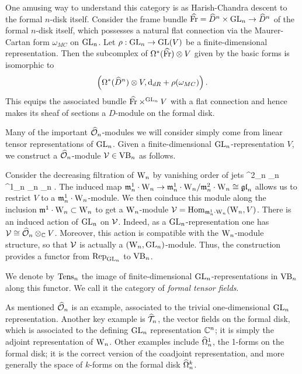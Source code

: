 \documentclass[10pt]{amsart}
\begin{document}
\begin{rmk}
One amusing way to understand this category is as Harish-Chandra descent to the formal $n$-disk itself. 
Consider the frame bundle $\widehat{{\rm Fr}} = \widehat{D}^n \times {\rm GL}_n \to \widehat{D}^n$ of the formal $n$-disk itself, 
which possesses a natural flat connection via the Maurer-Cartan form $\omega_{MC}$ on ${\rm GL}_n$. 
Let $\rho: {\rm GL}_n \to {\rm GL}(V)$ be a finite-dimensional representation. 
Then the subcomplex of $\Omega^*(\widehat{{\rm Fr}})\otimes V$ given by the basic forms is isomorphic to
\[
\left(\Omega^*(\widehat{D}^n) \otimes V, {\rm d}_{dR} + \rho(\omega_{MC}) \right).
\]
This equips the associated bundle $\widehat{{\rm Fr}}\times^{{\rm GL}_n} V$ with a flat connection and 
hence makes its sheaf of sections a $D$-module on the formal disk.
\end{rmk}

Many of the important $\widehat{\mathcal O}_n$-modules we will consider simply come from linear tensor representations of ${\rm GL}_n$. 
Given a finite-dimensional ${\rm GL}_n$-representation $V$, we construct a $\widehat{\mathcal O}_n$-module $\mathcal{V} \in {\rm VB}_n$ as follows. 

Consider the decreasing filtration of ${{\rm W}_n}$ by vanishing order of jets 
\ben
\cdots \subset \fm^{2}_n _{n} \subset \fm^1_n _n _n .
\een 
The induced map ${\mathfrak m}_n^1 \cdot {{\rm W}_n} \to {\mathfrak m}_n^1 \cdot {{\rm W}_n} / {\mathfrak m}_n^2
\cdot {{\rm W}_n} \cong {\mathfrak{gl}}_n$ allows us to restrict $V$ to a ${\mathfrak m}_n^1 \cdot
{{\rm W}_n}$-module. 
We  then coinduce this module along the inclusion ${\mathfrak m}^1 \cdot {{\rm W}_n}
\subset {{\rm W}_n}$ to get a ${{\rm W}_n}$-module $\mathcal{V} = {\rm Hom}_{{\mathfrak m}_n^1 \cdot {{\rm W}_n}}({{\rm W}_n},V)$. 
There is an induced action of ${\rm GL}_n$ on $\mathcal{V}$. Indeed, as a ${\rm GL}_n$-representation one has $\mathcal{V} \cong \widehat{\mathcal O}_n \otimes_{\mathbb C} V$.
Moreover, this action is compatible with the ${{\rm W}_n}$-module structure, so that $\mathcal{V}$ is actually a $({{\rm W}_n}, {\rm GL}_n)$-module. 
Thus, the construction provides a functor  from ${\rm Rep}_{{\rm GL}_n}$ to
${\rm VB}_n$.

\begin{dfn} 
We denote by ${\rm Tens}_n$ the image of finite-dimensional ${\rm GL}_n$-representations in ${\rm VB}_n$ along this functor. 
We call it the category of {\em formal tensor fields}.
\end{dfn}

As mentioned $\widehat{\mathcal O}_n$ is an example, associated to the trivial one-dimensional ${\rm GL}_n$ representation.
Another key example is $\widehat{\mathcal T}_n$, the vector fields on the formal disk, which is associated to the defining ${\rm GL}_n$ representation $\mathbb C^n$; 
it is simply the adjoint representation of ${{\rm W}_n}$.
Other examples include $\widehat{\Omega}^1_n$, the 1-forms on the formal disk; it
is the correct version of the coadjoint representation, and more
generally the space of $k$-forms on the formal disk $\widehat{\Omega}^k_n$. 
\end{document}
